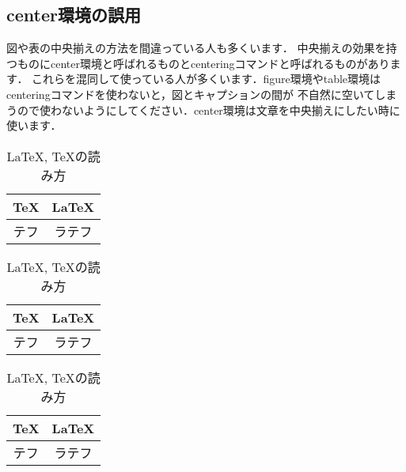 \documentclass[dvipdfmx,uplatex]{jsarticle}
\begin{document}
{\subsection{center環境の誤用}
図や表の中央揃えの方法を間違っている人も多くいます．
中央揃えの効果を持つものにcenter環境と呼ばれるものとcenteringコマンドと呼ばれるものがあります．
これらを混同して使っている人が多くいます．figure環境やtable環境はcenteringコマンドを使わないと，図とキャプションの間が
不自然に空いてしまうので使わないようにしてください．center環境は文章を中央揃えにしたい時に使います．
\begin{tcolorbox}[title=中央揃え]
  \begin{tcolorbox}[title=center環境を使用, colframe=wrongcolor]
    \begin{excode}
      \begin{table}[h]
        \caption{\LaTeX , \TeX の読み方}
        \begin{center}
          \begin{tabular}{c|c}
            \TeX & \LaTeX \\ \hline
            テフ & ラテフ
          \end{tabular}
        \end{center}
      \end{table}
      \begin{table}[h]
        \caption{\LaTeX , \TeX の読み方}
        \centering
        \begin{tabular}{c|c}
          \TeX & \LaTeX \\ \hline
          テフ & ラテフ
        \end{tabular}
      \end{table}
    \end{excode}
  \end{tcolorbox}
  \begin{tcolorbox}[title=centeringコマンドを使用, colframe=correctcolor]
    \begin{excode}
      \begin{table}[h]
        \centering
        \caption{\LaTeX , \TeX の読み方}
        \begin{tabular}{c|c}
          \TeX & \LaTeX \\ \hline
          テフ & ラテフ
        \end{tabular}
      \end{table}
    \end{excode}
  \end{tcolorbox}
\end{tcolorbox}
\begin{table}[h]

\end{table}}
\end{document}
